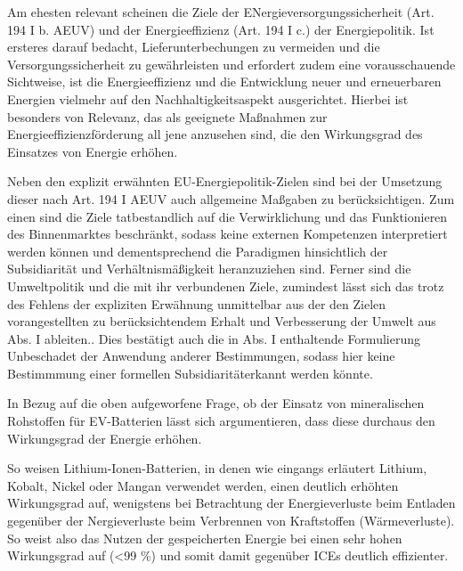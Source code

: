 \documentclass[12pt,a4paper,oneside]{book} %
\begin{document}
Am ehesten relevant scheinen die Ziele der ENergieversorgungssicherheit (Art. 194 I b. AEUV) und der Energieeffizienz (Art. 194 I c.) der Energiepolitik. Ist ersteres darauf bedacht, Lieferunterbechungen zu vermeiden und die Versorgungssicherheit zu gewährleisten\autocite[Nettesheim, Art. 194 Rn 16]{grabitz_recht_2024} und erfordert zudem eine vorausschauende Sichtweise\autocite[631]{umbach_europaische_2005}, ist die Energieeffizienz und die Entwicklung neuer und erneuerbaren Energien vielmehr auf den Nachhaltigkeitsaspekt ausgerichtet.\autocite[Nettesheim, Art. 194 Rn 17]{grabitz_recht_2024} Hierbei ist besonders von Relevanz, das als geeignete Maßnahmen zur Energieeffizienzförderung all jene anzusehen sind, die den Wirkungsgrad des Einsatzes von Energie erhöhen.\autocite[Nettesheim, Art. 194 Rn 16]{grabitz_recht_2024}
	
Neben den explizit erwähnten EU-Energiepolitik-Zielen sind bei der Umsetzung dieser nach Art. 194 I AEUV auch allgemeine Maßgaben zu berücksichtigen. Zum einen sind die Ziele \glqq tatbestandlich auf die Verwirklichung und das Funktionieren des Binnenmarktes beschränkt\grqq \autocite{Bings in Streinz, Art. 194 Rn. 32f.}, sodass keine externen Kompetenzen interpretiert werden können\autocite{Bings in Streinz, Art. 194 Rn. 33} und dementsprechend die Paradigmen hinsichtlich der Subsidiarität und Verhältnismäßigkeit heranzuziehen sind. Ferner sind die Umweltpolitik und die mit ihr verbundenen Ziele, zumindest lässt sich das trotz des Fehlens der expliziten Erwähnung unmittelbar aus der den Zielen vorangestellten zu berücksichtendem Erhalt und Verbesserung der Umwelt aus Abs. I ableiten.\autocite{Bings in Streinz, Art. 194 Rn. 33}. Dies bestätigt auch die in Abs. I enthaltende Formulierung \glqq Unbeschadet der Anwendung anderer Bestimmungen\grqq, sodass hier keine Bestimmmung einer \glqq formellen Subsidiarität\grqq erkannt werden könnte.\autocite{Nettesheim, Grabitz/Hilf/nettesheim AEUV Art. 194, Rn 35}
	
In Bezug auf die oben aufgeworfene Frage, ob der Einsatz von mineralischen Rohstoffen für EV-Batterien lässt sich argumentieren, dass diese durchaus den Wirkungsgrad der Energie erhöhen. 
	
So weisen Lithium-Ionen-Batterien, in denen wie eingangs erläutert Lithium, Kobalt, Nickel oder Mangan verwendet werden, einen deutlich erhöhten Wirkungsgrad auf, wenigstens bei Betrachtung der Energieverluste beim Entladen gegenüber der Nergieverluste beim Verbrennen von Kraftstoffen (Wärmeverluste). So weist also das Nutzen der gespeicherten Energie bei einen sehr hohen Wirkungsgrad auf (<99 \%) und somit damit gegenüber ICEs deutlich effizienter.%
\end{document}
